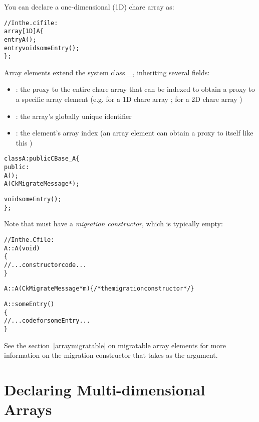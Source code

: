 You can declare a one-dimensional (1D) chare
array as:
%
\begin{alltt}
//In the .ci file:
array [1D] A \{
  entry A();
  entry void someEntry();
\};
\end{alltt}
%
Array elements extend the system class \_, inheriting
several fields:
%
\begin{itemize}
\item {}: the proxy to the entire chare array that can be indexed
  to obtain a proxy to a specific array element (e.g. for a 1D chare array
  ; for a 2D chare array )
\item {}: the array's globally unique identifier
\item {}: the element's array index (an array element can obtain a
  proxy to itself like this )
\end{itemize}
%
%
\begin{alltt}
class A : public CBase\_A \{
  public:
    A();
    A(CkMigrateMessage *);

    void someEntry();
\};
\end{alltt}
%
Note that  must have a \emph{migration constructor}, which is typically
empty:
%
\begin{alltt}
//In the .C file:
A::A(void)
\{
  //... constructor code ...
\}

A::A(CkMigrateMessage *m) \{ /* the migration constructor */ \}

A::someEntry()
\{
  // ... code for someEntry ...
\}
\end{alltt}
%
See the section~\ref{arraymigratable} on migratable array elements for more
information on the migration constructor that takes  as
the argument.

\section{Declaring Multi-dimensional Arrays}

